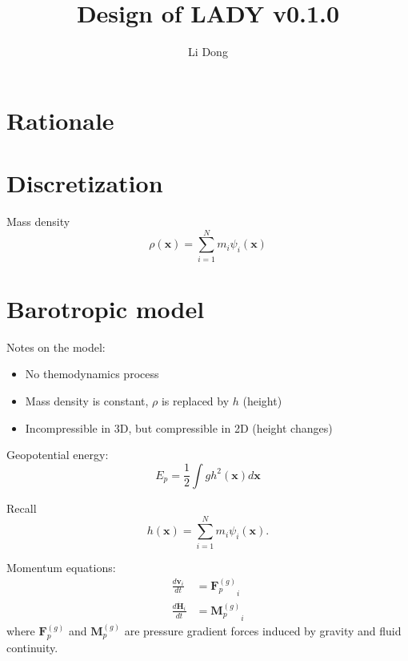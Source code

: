 \documentclass[slidestop,compress,mathserif]{beamer}
\title{Design of LADY v0.1.0}
\author{Li Dong}
\begin{document}
\begin{frame}
  \titlepage
\end{frame}

\section{Rationale}
\label{sec:Rationale}

\begin{frame}

\end{frame}

\section{Discretization}
\label{sec:Discretization}

\begin{frame}
  Mass density
  \begin{equation}
    \rho(\mathbf{x}) = \sum_{i = 1}^{N} m_i \psi_i(\mathbf{x})
  \end{equation}
\end{frame}

\section{Barotropic model}
\label{sec:Barotropic model}

\begin{frame}
  Notes on the model:
  \begin{itemize}
    \item No themodynamics process
    \item Mass density is constant, $\rho$ is replaced by $h$ (height)
    \item Incompressible in 3D, but compressible in 2D (height changes)
  \end{itemize}
  Geopotential energy:
  \begin{equation}
    E_p = \frac{1}{2} \int g h^2(\mathbf{x}) d\mathbf{x}
    \label{eqn:geopotential-energy}
  \end{equation}
  \begin{exampleblock}{Recall}
    \begin{equation*}
      h(\mathbf{x}) = \sum_{i = 1}^{N} m_i \psi_i(\mathbf{x}).
    \end{equation*}
  \end{exampleblock}
\end{frame}

\begin{frame}
  Momentum equations:
  \begin{align}
    \frac{d \mathbf{v}_i}{d t} & = {\mathbf{F}_p^{(g)}}_i \\
    \frac{d \dot{\mathbf{H}}_i}{d t} & = {\mathbf{M}_p^{(g)}}_i
  \end{align}
  where ${\mathbf{F}_p^{(g)}}$ and ${\mathbf{M}_p^{(g)}}$ are pressure gradient forces induced by gravity and fluid continuity.
\end{frame}
\end{document}
